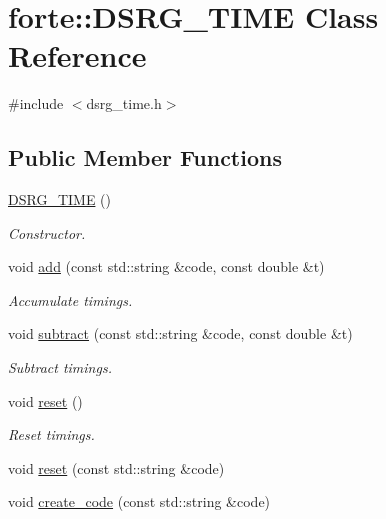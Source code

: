 \hypertarget{classforte_1_1_d_s_r_g___t_i_m_e}{}\section{forte\+:\+:D\+S\+R\+G\+\_\+\+T\+I\+ME Class Reference}
\label{classforte_1_1_d_s_r_g___t_i_m_e}


{\ttfamily \#include $<$dsrg\+\_\+time.\+h$>$}

\subsection*{Public Member Functions}
\begin{DoxyCompactItemize}
\item 
\mbox{\hyperlink{classforte_1_1_d_s_r_g___t_i_m_e_a48855e5a550f6071615a20d3fe6c6926}{D\+S\+R\+G\+\_\+\+T\+I\+ME}} ()
\begin{DoxyCompactList}\small\item\em Constructor. \end{DoxyCompactList}\item 
void \mbox{\hyperlink{classforte_1_1_d_s_r_g___t_i_m_e_a48dba65b329e97e25265999940156c55}{add}} (const std\+::string \&code, const double \&t)
\begin{DoxyCompactList}\small\item\em Accumulate timings. \end{DoxyCompactList}\item 
void \mbox{\hyperlink{classforte_1_1_d_s_r_g___t_i_m_e_ae39cb2b7b5e9854bc10a174f2733d744}{subtract}} (const std\+::string \&code, const double \&t)
\begin{DoxyCompactList}\small\item\em Subtract timings. \end{DoxyCompactList}\item 
void \mbox{\hyperlink{classforte_1_1_d_s_r_g___t_i_m_e_ac81b3fc66ac541d63649e84cc30df463}{reset}} ()
\begin{DoxyCompactList}\small\item\em Reset timings. \end{DoxyCompactList}\item 
void \mbox{\hyperlink{classforte_1_1_d_s_r_g___t_i_m_e_a070c7ab301e9a3e3f4fca2c4e0321981}{reset}} (const std\+::string \&code)
\item 
void \mbox{\hyperlink{classforte_1_1_d_s_r_g___t_i_m_e_afc16aca0ff3b85a87350806ad589614f}{create\+\_\+code}} (const std\+::string \&code)

\end{DoxyCompactItemize}
